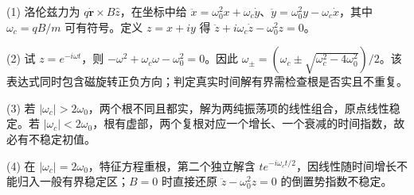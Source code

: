 (1) 洛伦兹力为 $q\dot{\mathbf r}\times B\hat z$，在坐标中给 $\ddot x=\omega_0^2x+\omega_c\dot y$、$\ddot y=\omega_0^2y-\omega_c\dot x$，其中 $\omega_c=qB/m$ 可有符号。定义 $z=x+iy$ 得 $\ddot z+i\omega_c\dot z-\omega_0^2z=0$。

(2) 试 $z=e^{-i\omega t}$，则 $-\omega^2+\omega_c\omega-\omega_0^2=0$。因此 $\omega_\pm=(\omega_c\pm\sqrt{\omega_c^2-4\omega_0^2})/2$。该表达式同时包含磁旋转正负方向；判定真实时间解有界需检查根是否实且不重复。

(3) 若 $|\omega_c|>2\omega_0$，两个根不同且都实，解为两纯振荡项的线性组合，原点线性稳定。若 $|\omega_c|<2\omega_0$，根有虚部，两个复根对应一个增长、一个衰减的时间指数，故必有不稳定初值。

(4) 在 $|\omega_c|=2\omega_0$，特征方程重根，第二个独立解含 $t e^{-i\omega_ct/2}$，因线性随时间增长不能归入一般有界稳定区；$B=0$ 时直接还原 $\ddot z-\omega_0^2z=0$ 的倒置势指数不稳定。
